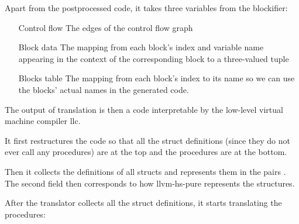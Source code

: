 Apart from the postprocessed code, it takes three variables from the blockifier:


\begin{enumerate}
    \item[Control flow] The edges of the control flow graph
    \item[Block data] The mapping from each block's index and variable name appearing in the context of the corresponding block to a three-valued tuple \linebreak {}
    \item[Blocks table] The mapping from each block's index to its name so we can use the blocks' actual names in the generated code.
\end{enumerate}

The output of translation is then a code interpretable by the low-level virtual machine compiler llc.

It first restructures the code so that all the struct definitions (since they do not ever call any procedures) are at the top and the procedures are at the bottom.

Then it collects the definitions of all structs and represents them in the pairs \linebreak {}. The second field then corresponds to how llvm-hs-pure represents the structures.

After the translator collects all the struct definitions, it starts translating the procedures:


